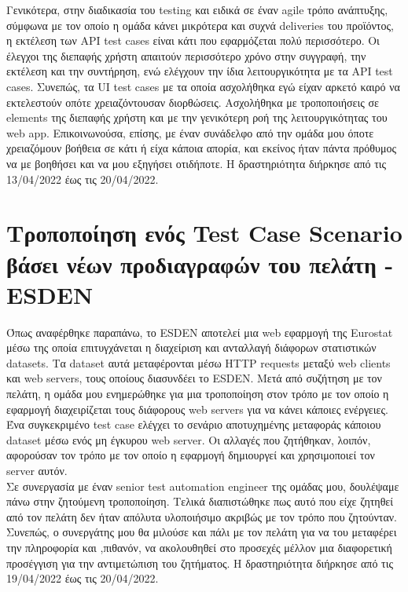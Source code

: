 Γενικότερα, στην διαδικασία του testing και ειδικά 
σε έναν agile τρόπο ανάπτυξης, σύμφωνα με τον οποίο η ομάδα κάνει μικρότερα και συχνά deliveries του προϊόντος, η εκτέλεση των API test cases είναι κάτι που 
εφαρμόζεται πολύ περισσότερο. Οι έλεγχοι της διεπαφής χρήστη απαιτούν περισσότερο χρόνο στην συγγραφή, την εκτέλεση και την συντήρηση, ενώ ελέγχουν την ίδια 
λειτουργικότητα με τα API test cases. Συνεπώς, τα UI test cases με τα οποία ασχολήθηκα εγώ είχαν αρκετό καιρό να εκτελεστούν οπότε χρειαζόντουσαν διορθώσεις.
Ασχολήθηκα με τροποποιήσεις σε elements της διεπαφής χρήστη και με την γενικότερη ροή της λειτουργικότητας του web app. Επικοινωνούσα, επίσης, με έναν συνάδελφο 
από την ομάδα μου όποτε χρειαζόμουν βοήθεια σε κάτι ή είχα κάποια απορία, και εκείνος ήταν πάντα πρόθυμος να με βοηθήσει και να μου εξηγήσει οτιδήποτε.
Η δραστηριότητα διήρκησε από τις 13/04/2022 έως τις 20/04/2022.

\section*{Τροποποίηση ενός Test Case Scenario βάσει νέων προδιαγραφών του πελάτη - ESDEN}
Όπως αναφέρθηκε παραπάνω, το ESDEN αποτελεί μια web εφαρμογή της Eurostat μέσω της οποία επιτυγχάνεται η διαχείριση και ανταλλαγή διάφορων στατιστικών datasets. Τα dataset 
αυτά μεταφέρονται μέσω HTTP requests μεταξύ web clients και web servers, τους οποίους διασυνδέει το ESDEN. Μετά από συζήτηση με τον πελάτη, η ομάδα μου ενημερώθηκε για μια 
τροποποίηση στον τρόπο με τον οποίο η εφαρμογή διαχειρίζεται τους διάφορους web servers για να κάνει κάποιες ενέργειες. Ένα συγκεκριμένο test case ελέγχει το σενάριο αποτυχημένης 
μεταφοράς κάποιου dataset μέσω ενός μη έγκυρου web server. Οι αλλαγές που ζητήθηκαν, λοιπόν, αφορούσαν τον τρόπο με τον οποίο η εφαρμογή δημιουργεί και χρησιμοποιεί 
τον server αυτόν. \\ 

Σε συνεργασία με έναν senior test automation engineer της ομάδας μου, δουλέψαμε πάνω στην ζητούμενη τροποποίηση. Τελικά διαπιστώθηκε πως αυτό που είχε ζητηθεί 
από τον πελάτη δεν ήταν απόλυτα υλοποιήσιμο ακριβώς με τον τρόπο που ζητούνταν. Συνεπώς, ο συνεργάτης μου θα μιλούσε και πάλι με τον πελάτη για να του μεταφέρει 
την πληροφορία και ,πιθανόν, να ακολουθηθεί στο προσεχές μέλλον μια διαφορετική προσέγγιση για την αντιμετώπιση του ζητήματος. Η δραστηριότητα διήρκησε από τις 19/04/2022 έως τις 20/04/2022.

